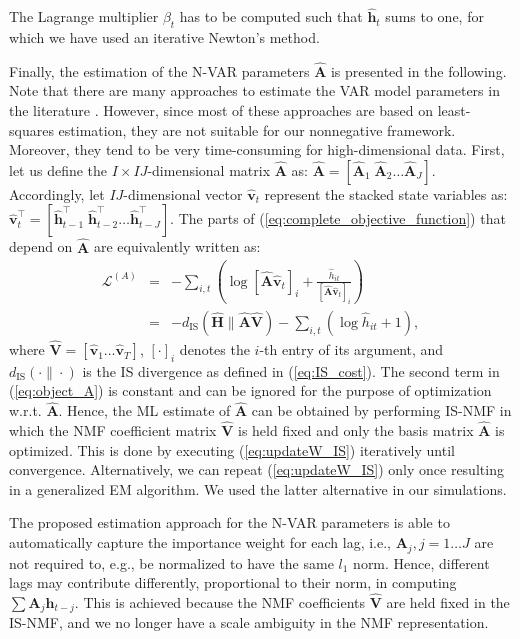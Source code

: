 \documentclass[10pt,twocolumn,twoside] {IEEEtran}
\begin{document}
The Lagrange multiplier $\beta_{t}$ has
to be computed such that $\hat{\mathbf{h}}_{t}$ sums to one, for which we have used an
iterative Newton\textquoteright{}s method.

Finally, the estimation of the N-VAR parameters $\hat{\mathbf{A}}$ is presented in the following.
Note that there are many approaches to estimate the VAR model parameters
in the literature \cite{Hamilton1994,Luetkepohl2005}. However, since
most of these approaches are based on least-squares estimation, they are
not suitable for our nonnegative framework. Moreover, they tend to be
very time-consuming for high-dimensional data. First, let us define
the $I\times IJ$-dimensional matrix $\hat{\mathbf{A}}$ as: $\hat{\mathbf{A}}=\left[\hat{\mathbf{A}}_{1}\;\hat{\mathbf{A}}_{2}\ldots\hat{\mathbf{A}}_{J}\right]$.
Accordingly, let $IJ$-dimensional vector $\hat{\mathbf{v}}_{t}$ represent the stacked state
variables as: $\hat{\mathbf{v}}_{t}^{\top}=\left[\hat{\mathbf{h}}_{t-1}^{\top}\;\hat{\mathbf{h}}_{t-2}^{\top}\ldots\hat{\mathbf{h}}_{t-J}^{\top}\right]$.
The parts of (\ref{eq:complete_objective_function}) that depend on $\hat{\mathbf{A}}$ are equivalently written as:
\begin{eqnarray}
\mathcal{L}^{\left(A\right)} & = & -\sum_{i,t}\left(\log\left[\hat{\mathbf{A}}\hat{\mathbf{v}}_{t}\right]_{i}+\frac{\hat{h}_{it}}{\left[\hat{\mathbf{A}}\hat{\mathbf{v}}_{t}\right]_{i}}\right)\nonumber \\
 & = & -d_{\text{IS}}\left(\mathbf{\hat{H}\|}\hat{\mathbf{A}}\mathbf{\hat{V}}\right)-\sum_{i,t}\left(\log\hat{h}_{it}+1\right),\label{eq:object_A}
\end{eqnarray}
where $\mathbf{\hat{V}}=[\hat{\mathbf{v}}_{1}\ldots \hat{\mathbf{v}}_{T}]$,  $\left[\cdot\right]_{i}$ denotes the $i$-th entry of its argument, and $d_{\text{IS}}\left(\cdot\|\cdot\right)$ is the IS divergence
as defined in (\ref{eq:IS_cost}). The second term in (\ref{eq:object_A})
is constant and can be ignored for the purpose of optimization w.r.t.
$\hat{\mathbf{A}}$. Hence, the ML estimate of $\hat{\mathbf{A}}$ can be obtained by performing IS-NMF in which the NMF coefficient
matrix $\mathbf{\hat{V}}$ is held fixed and only the basis matrix
$\hat{\mathbf{A}}$ is optimized. This is done by executing (\ref{eq:updateW_IS})
iteratively until convergence. Alternatively, we can repeat (\ref{eq:updateW_IS})
only once resulting in a generalized EM algorithm. We used
the latter alternative in our simulations.

The proposed estimation approach for the N-VAR parameters is able to automatically capture the importance weight for each lag, i.e., $\mathbf{A}_j,j=1\ldots J$  are not required to, e.g., be normalized to have the same $l_1$ norm. Hence, different lags may contribute differently, proportional to their norm, in computing $\sum\mathbf{A}_{j}\mathbf{h}_{t-j}$. This is achieved because the NMF coefficients $\mathbf{\hat{V}}$ are held fixed
in the IS-NMF, and we no longer have a scale ambiguity in the NMF representation.
%
\end{document}
